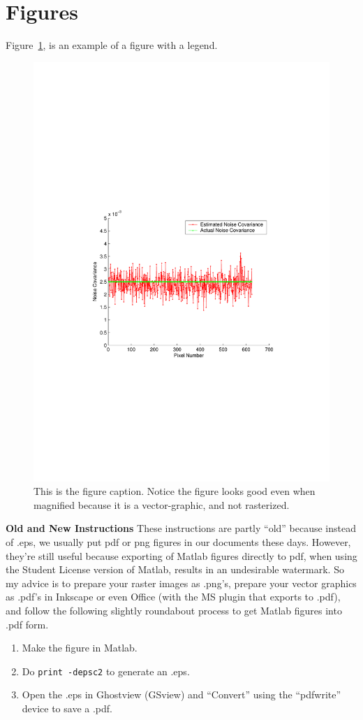 \section{Figures} \label{sectionExample}

Figure~\ref{ExampleEstNoiseCovar}, is an example of a figure with a legend.

\begin{figure}[h]
\centering
\includegraphics[width=0.5\linewidth]{exampleEstNoiseCovar}
\caption{This is the figure caption. Notice the figure looks good even when magnified because it is a vector-graphic, and not rasterized.} \label{ExampleEstNoiseCovar}
\end{figure}


\textbf{Old and New Instructions} These instructions are partly ``old'' because instead of .eps, we usually put pdf or png figures in our documents these days. However, they're still useful because exporting of Matlab figures directly to pdf, when using the Student License version of Matlab, results in an undesirable watermark. So my advice is to prepare your raster images as .png's, prepare your vector graphics as .pdf's in Inkscape or even Office (with the MS plugin that exports to .pdf), and follow the following slightly roundabout process to get Matlab figures into .pdf form.
\begin{enumerate}
  \item Make the figure in Matlab.
  \item Do \texttt{print -depsc2} to generate an .eps.
  \item Open the .eps in Ghostview (GSview) and ``Convert'' using the ``pdfwrite'' device to save a .pdf.
\end{enumerate}



